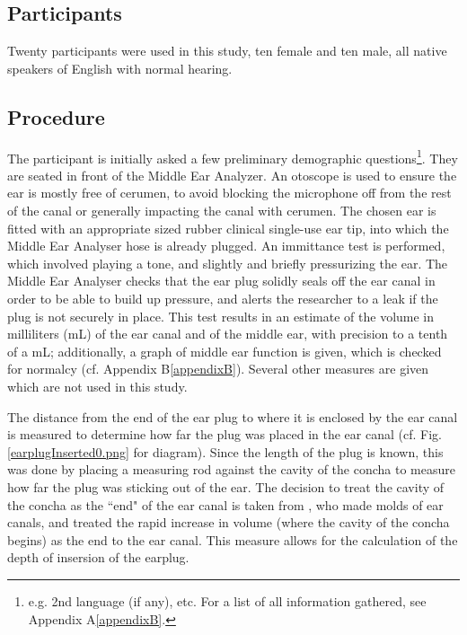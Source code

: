 \documentclass[dissertation,copyright]{uathesis}
\begin{document}
\subsection{Participants}
Twenty participants were used in this study, ten female and ten male, all native speakers of English with normal hearing.

\subsection{Procedure}

The participant is initially asked a few preliminary demographic questions\footnote{e.g. 2nd language (if any), etc. For a list of all information gathered, see Appendix A\ref{appendixB}.}. They are seated in front of the Middle Ear Analyzer.  An otoscope is used to ensure the ear is mostly free of cerumen, to avoid blocking the microphone off from the rest of the canal or generally impacting the canal with cerumen.  The chosen ear is fitted with an appropriate sized rubber clinical single-use ear tip, into which the Middle Ear Analyser hose is already plugged.  An immittance test is performed, which involved playing a tone, and slightly and briefly pressurizing the ear.  The Middle Ear Analyser checks that the ear plug solidly seals off the ear canal in order to be able to build up pressure, and alerts the researcher to a leak if the plug is not securely in place.  This test results in an estimate of the volume in milliliters (mL) of the ear canal and of the middle ear, with precision to a tenth of a mL; additionally, a graph of middle ear function is given, which is checked for normalcy (cf. Appendix B\ref{appendixB}).  Several other measures are given which are not used in this study.

The distance from the end of the ear plug to where it is enclosed by the ear canal is measured to determine how far the plug was placed in the ear canal (cf. Fig. \ref{earplugInserted0.png} for diagram).  Since the length of the plug is known, this was done by placing a measuring rod against the cavity of the concha to measure how far the plug was sticking out of the ear. The decision to treat the cavity of the concha as the ``end" of the ear canal is taken from \cite{stenfelt:07}, who made molds of ear canals, and treated the rapid increase in volume (where the cavity of the concha begins) as the end to the ear canal.  This measure allows for the calculation of the depth of insersion of the earplug.
\end{document}
